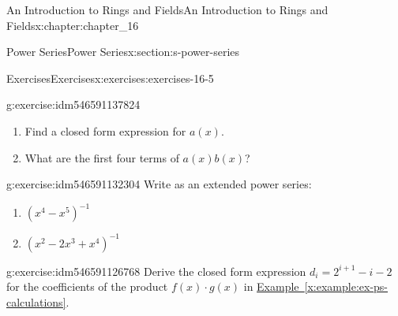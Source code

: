 \documentclass[oneside,10pt,]{book}
\newcommand{\xreffont}{\relax}
\numberwithin{equation}{section}
\begin{document}
\begin{chapterptx}{An Introduction to Rings and Fields}{}{An Introduction to Rings and Fields}{}{}{x:chapter:chapter_16}
\begin{sectionptx}{Power Series}{}{Power Series}{}{}{x:section:s-power-series}
\begin{exercises-subsection}{Exercises}{}{Exercises}{}{}{x:exercises:exercises-16-5}
\begin{divisionexercise}{6}{}{}{g:exercise:idm546591137824}
\begin{enumerate}[label=(\alph*)]
\item{}Find a closed form expression for \(a(x)\).%
\item{}What are the first four terms of \(a(x) b(x)\)?%
\end{enumerate}
%
\end{divisionexercise}%
\begin{divisionexercise}{7}{}{}{g:exercise:idm546591132304}%
Write as an extended power series:%
\begin{enumerate}[label=(\alph*)]
\item{}\(\left(x^4-x^5\right)^{-1}\)%
\item{}\(\left(x^2-2x^3+x^4\right)^{-1}\)%
\end{enumerate}
%
\end{divisionexercise}%
\begin{divisionexercise}{8}{}{}{g:exercise:idm546591126768}%
Derive the closed form expression \(d_i = 2^{i+1}-i -2 \) for the coefficients of the product \(f(x)\cdot g(x)\) in \hyperref[x:example:ex-ps-calculations]{Example~{\xreffont\ref{x:example:ex-ps-calculations}}}.%
\end{divisionexercise}%
\end{exercises-subsection}
\end{sectionptx}
\end{chapterptx}
%
%
%
%
\typeout{************************************************}
\typeout{************************************************}
%
%
\appendix
%
\end{document}
